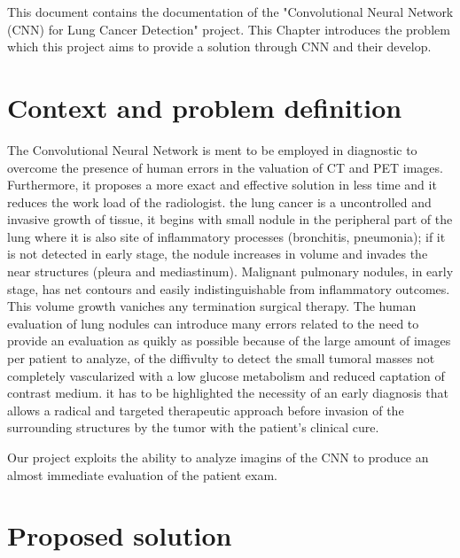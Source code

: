 \documentclass[../main.tex]{subfiles}
\begin{document}
\thispagestyle{empty}
This document contains the documentation of the "Convolutional Neural Network (CNN) for Lung Cancer Detection" project. This Chapter introduces the problem which this project aims to provide a solution through CNN and their develop.

\section{Context and problem definition}
The Convolutional Neural Network is ment to be employed in diagnostic to overcome the presence of human errors in the valuation of CT and PET images. Furthermore, it proposes a more exact and effective solution in less time and it reduces the work load of the radiologist.
the lung cancer is a uncontrolled and invasive growth of tissue, it begins with small nodule in the peripheral part of the lung where it is also site of inflammatory processes (bronchitis, pneumonia); if it is not detected in early stage, the nodule increases in volume and invades the near structures (pleura and mediastinum). Malignant pulmonary nodules, in early stage, has net contours and easily indistinguishable from inflammatory outcomes. This volume growth vaniches any termination surgical therapy.
The human evaluation of lung nodules can introduce many errors related to the need to provide an evaluation as quikly as possible because of the large amount of images per patient to analyze, of the diffivulty to detect the small tumoral masses not completely vascularized with a low glucose metabolism and reduced captation of contrast medium.
it has to be highlighted the necessity of an early diagnosis that allows a radical and targeted therapeutic approach before invasion of the  surrounding structures by the tumor with the patient's clinical cure.
\vspace{5mm}

Our project exploits the ability to analyze imagins of the CNN to produce an almost immediate evaluation of the patient exam.

\section{Proposed solution}

\vspace{5mm}
\end{document}
